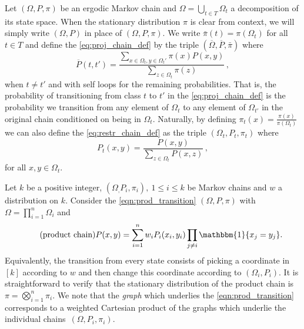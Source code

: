 \documentclass[a4paper, 12p]{article}
\numberwithin{equation}{section}
\newcommand{\Omproj}{\overline{\Omega}}
\newcommand{\Pproj}{\overline{P}}
\newcommand{\Om}{\Omega}
\begin{document}
Let $(\Om,P,\pi)$ be an ergodic Markov chain and $\Om=\bigcup_{t\in T}\Om_t$ a decomposition of its state space. When the stationary distribution $\pi$ is clear from context, we will simply write $(\Omega, P)$ in place of $(\Omega, P, \pi)$. We write $\bar\pi(t) = \pi(\Omega_t)$ for all $t \in T$ and define the \ref{eq:proj_chain_def} by the triple $(\Omproj,\Pproj, \bar\pi)$ where
\begin{equation}\tag{projection chain}\label{eq:proj_chain_def}
    \Pproj(t,t') = \frac{\sum_{x \in \Omega_t, y \in \Omega_t'} \pi(x) P(x, y)}{\sum_{z \in \Omega_t}\pi(z)}\,,
\end{equation}
when $t \neq t'$ and with self loops for the remaining probabilities.
That is, the probability of transitioning from class $t$ to $t'$ in the \ref{eq:proj_chain_def} is the probability we transition from any element of $\Om_t$ to any element of $\Om_{t'}$ in the original chain conditioned on being in $\Om_t$. Naturally, by defining
$\pi_t(x)=\frac{\pi(x)}{\pi(\Omega_t)}$
we can also define the \ref{eq:restr_chain_def} as the triple $(\Omega_t, P_t, \pi_t)$ where
\begin{equation}
\label{eq:restr_chain_def}\tag{restriction chain}
P_t(x, y) = \frac{P(x, y)}{\sum_{z \in \Omega_t} P(x, z)}\,,
\end{equation}
for all $x, y \in \Omega_t$.

Let $k$ be a positive integer, $(\Omega_, P_i, \pi_i),\ 1\leq i\leq k$ be Markov chains and $w$ a distribution on $k$. Consider the \ref{eqn:prod_transition} $(\Om,P,\pi)$ with $\Om=\prod_{i=1}^n \Om_i$ and
\begin{equation}\label{eqn:prod_transition}\tag{product chain}
P(x,y)=\sum_{i=1}^n w_i P_i(x_i,y_i)\prod_{j\ne i}\mathbbm{1}\{x_j=y_j\}.    
\end{equation}
Equivalently, the transition from every state consists of picking a coordinate in $[k]$ according to $w$ and then change this coordinate according to $(\Om_i,P_i)$. It is straightforward to verify that the stationary distribution of the product chain is $\pi=\bigotimes_{i=1}^n\pi_i$. We note that the \emph{graph} which underlies the \ref{eqn:prod_transition} corresponds to a weighted Cartesian product of the graphs which underlie the individual chains~$(\Omega, P_i, \pi_i)$.
\end{document}

